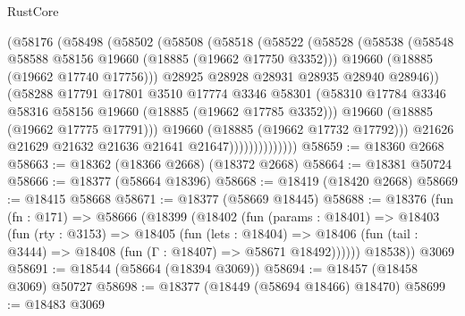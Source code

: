 \begin{lexlean}{RustCore}
\begin{coremodule}
                        (@58176
                          (@58498
                            (@58502
                              (@58508
                                (@58518
                                  (@58522
                                    (@58528
                                      (@58538
                                        (@58548 @58588 @58156 @19660 (@18885 (@19662 @17750 @3352)))
                                        @19660
                                        (@18885 (@19662 @17740 @17756)))
                                      @28925
                                      @28928
                                      @28931
                                      @28935
                                      @28940
                                      @28946))
                                  (@58288
                                    @17791
                                    @17801
                                    @3510
                                    @17774
                                    @3346
                                    @58301
                                    (@58310
                                      @17784
                                      @3346
                                      @58316
                                      @58156
                                      @19660
                                      (@18885 (@19662 @17785 @3352)))
                                    @19660
                                    (@18885 (@19662 @17775 @17791)))
                                  @19660
                                  (@18885 (@19662 @17732 @17792)))
                                @21626
                                @21629
                                @21632
                                @21636
                                @21641
                                @21647))))))))))))))
@58659 := @18360 @2668
@58663 := @18362 (@18366 @2668) (@18372 @2668)
@58664 := @18381 @50724
@58666 := @18377 (@58664 @18396)
@58668 := @18419 (@18420 @2668)
@58669 := @18415 @58668
@58671 := @18377 (@58669 @18445)
@58688 := @18376
    (fun (fn : @171) =>
    @58666
      (@18399
        (@18402
          (fun (params : @18401) =>
          @18403
            (fun (rty : @3153) =>
            @18405
              (fun (lets : @18404) =>
              @18406 (fun (tail : @3444) => @18408 (fun (Γ : @18407) => @58671 @18492))))))
        @18538))
    @3069
@58691 := @18544 (@58664 (@18394 @3069))
@58694 := @18457 (@18458 @3069) @50727
@58698 := @18377 (@18449 (@58694 @18466) @18470)
@58699 := @18483 @3069

\end{coremodule}
\end{lexlean}
